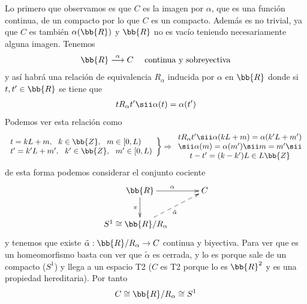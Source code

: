 \begin{ejemplo}
\begin{enumerate}
        Lo primero que observamos es que $C$ es la imagen por $\alpha$, que es una función continua, de un compacto por lo que $C$ es un compacto. Además es no trivial, ya que $C$ es también $\alpha(\bb{R})$ y $\bb{R}$ no es vacío teniendo necesariamente alguna imagen. Tenemos
        \begin{gather*}
            \bb{R} \overset{\alpha}{\longrightarrow} C \quad \text{ continua y sobreyectiva}
        \end{gather*} 
        y así habrá una relación de equivalencia $R_\alpha$ inducida por $\alpha$ en $\bb{R}$ donde si $t,t'\in \bb{R}$ se tiene que 
        \begin{gather*}
            t R_\alpha t' \sii \alpha(t) = \alpha(t')
        \end{gather*}
        Podemos ver esta relación como
        \begin{gather*}
            \left.
            \begin{array}{l}
                t = kL + m,\ \  k\in \bb{Z},\ \  m\in [0,L)\\
                t' = k'L + m',\ \ k'\in \bb{Z},\ \  m'\in [0,L)
            \end{array}
            \right\} \Rightarrow 
            \begin{array}{c}
                t R_\alpha t' \sii \alpha(kL + m) = \alpha(k'L + m') \\ 
                \sii \alpha(m)=\alpha(m') \sii m=m' \sii\\
                t-t' = (k-k')L\in L\bb{Z}
            \end{array}
        \end{gather*}
        de esta forma podemos considerar el conjunto cociente
        \begin{gather*}
            \xymatrix{
                \bb{R} \ar[r]^\alpha \ar[d]_\pi & C \\
                S^1 \cong \bb{R} / R_\alpha \quad \ar@{-->}[ur]_{\tilde{\alpha}}
            }
        \end{gather*}
        y tenemos que existe $\tilde{\alpha} : \bb{R}/R_\alpha \to C$ continua y biyectiva. Para ver que es un homeomorfismo basta con ver que $\tilde{\alpha}$ es cerrada, y lo es porque sale de un compacto ($S^1$) y llega a un espacio T2 ($C$ es T2 porque lo es $\bb{R}^2$ y es una propiedad hereditaria). Por tanto
        \begin{gather*}
            C \cong \bb{R}/R_\alpha \cong S^1
        \end{gather*}

\end{enumerate}
\end{ejemplo}
